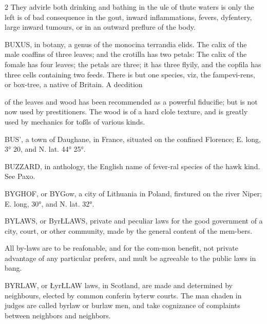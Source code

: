 \documentclass[10pt]{article}
\begin{document}
\begin{multicols}{2}
They advirle both drinking and bathing in the ule of thute waters is only the left is of bad consequence in the gout, inward inflammations, fevers, dyfentery, large inward tumours, or in an outward preflure of the body.

BUXUS, in botany, a genus of the monocina terrandia elids. The calix of the male coaffins of three leaves; and the crotilla has two petals: The calix of the fomale has four leaves; the petals are three; it has three flyily, and the copfila has three cells containing two feeds. There is but one species, viz, the fampevi-rens, or box-tree, a native of Britain. A decdition

of the leaves and wood has been recommended as a powerful fiducifie; but is not now used by prestitioners. The wood is of a hard clole texture, and is greatly used by mechanics for toßls of various kinds.

BUS', a town of Daughane, in France, situated on the confined Florence; E. long, 3° 20, and N. lat. 44° 25°.

BUZZARD, in anthology, the English name of fever-ral species of the hawk kind. See Paxo.

BYGHOF, or BYGow, a city of Lithuania in Poland, firstured on the river Niper; E. long, 30°, and N. lat. 32°.

BYLAWS, or ByrŁLAWS, private and peculiar laws for the good government of a city, court, or other community, made by the general content of the mem-bers.

All by-laws are to be reafonable, and for the com-mon benefit, not private advantage of any particular prefers, and mult be agreeable to the public laws in bang.

BYRLAW, or ŁyrŁLAW laws, in Scotland, are made and determined by neighbours, elected by common conferin byterw courts. The man chaden in judges are called byrlaw or burlaw men, and take cognizance of complaints between neighbors and neighbors.


\end{multicols}
\end{document}
